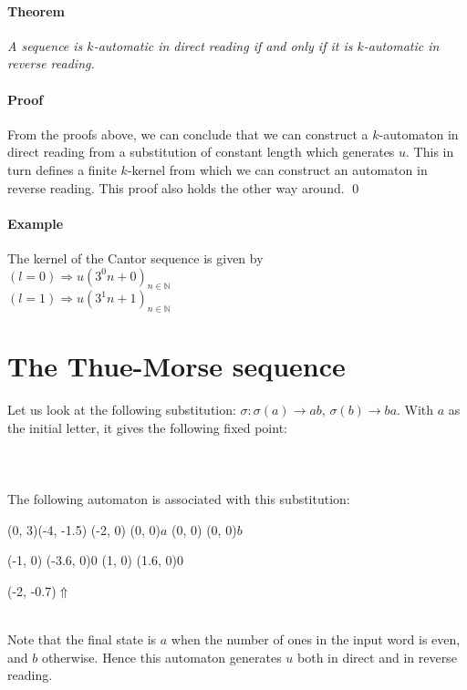 \documentclass{article}
\begin{document}
\paragraph{Theorem} \emph{A sequence is $k$-automatic in direct reading if and 
only if it is $k$-automatic in reverse reading.}

\paragraph{Proof} From the proofs above, we can conclude that we can construct 
a $k$-automaton in direct reading from a substitution of constant length which 
generates $u$.  This in turn defines a finite $k$-kernel from which we can 
construct an automaton in reverse reading. This proof also holds the other way 
around. \qed

\paragraph{Example} The kernel of the Cantor sequence is given by
\\
$(l = 0) \Rightarrow u(3^0 n + 0)_{n \in \mathbb{N}}$\\
$(l = 1) \Rightarrow u(3^1 n + 1)_{n \in \mathbb{N}}$\\

\section*{The Thue-Morse sequence}
Let us look at the following substitution: $\sigma: \sigma(a) \rightarrow ab$,
$\sigma(b) \rightarrow ba$. With $a$ as the initial letter, it gives the
following fixed point:\\
\\
\\
\\
The following automaton is associated with this
substitution:\\
\begin{graph}(0, 3)(-4, -1.5)
  (-2, 0) (0, 0){$a$}
  (0, 0)  (0, 0){$b$}

  (-1, 0) \freetext(-3.6, 0){0}
   
   
  (1, 0) \freetext(1.6, 0){0}

  \freetext(-2, -0.7){$\Uparrow$}
\end{graph}\\
Note that the final state is $a$ when the number of ones in the input word
is even, and $b$ otherwise. Hence this automaton generates $u$ both in direct
and in reverse reading.
\end{document}

